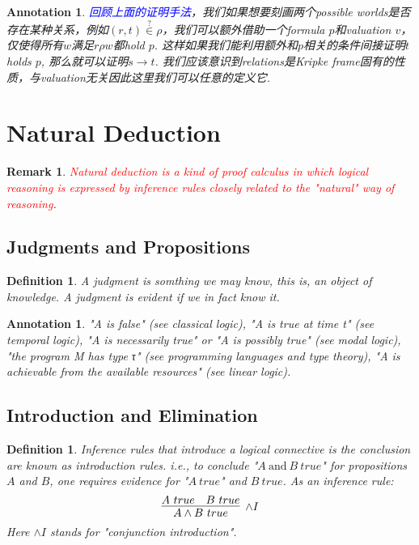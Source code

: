 \documentclass{article}
\theoremstyle{plain}
\newtheorem{definition}[theorem]{Definition}
\newtheorem{remark}[theorem]{Remark}
\newtheorem{annotation}[theorem]{Annotation}
\theoremstyle{nonumberplain}
\newcommand{\redt}[1]{\textcolor{red}{#1}}
\newcommand{\bluet}[1]{\textcolor{blue}{#1}}
\begin{document}
\begin{annotation}
\rm \bluet{回顾上面的证明手法}，我们如果想要刻画两个possible worlds是否存在某种关系，例如$(r,t) \stackrel{?}{\in} \rho$，我们可以额外借助一个formula $p$和valuation $v$，仅使得所有$w$满足$r \rho w$都hold $p$. 这样如果我们能利用额外和$p$相关的条件间接证明$t$ holds $p$, 那么就可以证明$s \to t$. 我们应该意识到relations是Kripke frame固有的性质，与valuation无关因此这里我们可以任意的定义它.  
\end{annotation}

\newpage
\section{Natural Deduction}

\begin{remark}
\rm \redt{Natural deduction is a kind of proof calculus in which logical reasoning is expressed by inference rules closely related to the "natural" way of reasoning}. 
\end{remark}

\subsection{Judgments and Propositions}

\begin{definition}
\rm A \emph{judgment} is somthing we may know, this is, an object of knowledge. A judgment is \emph{evident} if we in fact know it.
\end{definition}

\begin{annotation}
\rm "A is false" (see classical logic), "A is true at time t" (see temporal logic), "A is necessarily true" or "A is possibly true" (see modal logic), "the program M has type τ" (see programming languages and type theory), "A is achievable from the available resources" (see linear logic). 
\end{annotation}


\subsection{Introduction and Elimination}

\begin{definition}
\rm Inference rules that introduce a logical connective is the conclusion are known as \emph{introduction rules}. i.e., to conclude "$A~\text{and}~B~true$" for propositions $A$ and $B$, one requires evidence for "$A~true$" and $B~true$. As an inference rule:
$$
\infer[\wedge I]{A \wedge B ~true}{A~true & B~true}
$$
Here $\wedge I$ stands for "conjunction introduction".
\end{definition}
\end{document}
